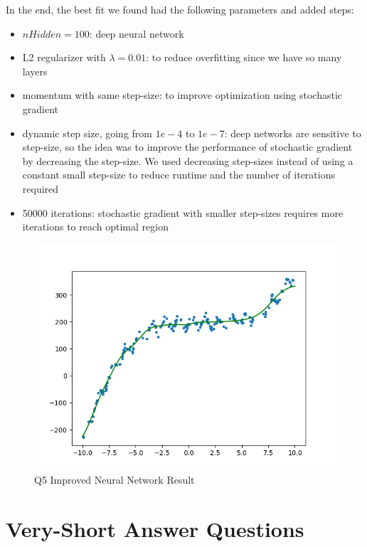 \documentclass{article}
\def\items#1{\begin{itemize}#1\end{itemize}}
\begin{document}
In the end, the best fit we found had the following parameters and added steps:
\items{
    \item $nHidden = 100$: deep neural network
    \item L2 regularizer with $\lambda = 0.01$: to reduce overfitting since we have so many layers
    \item momentum with same step-size: to improve optimization using stochastic gradient
    \item dynamic step size, going from $1e-4$ to $1e-7$: deep networks are sensitive to step-size, so the idea was to improve the performance of stochastic gradient by decreasing the step-size. We used decreasing step-sizes instead of using a constant small step-size to reduce runtime and the number of iterations required
    \item 50000 iterations: stochastic gradient with smaller step-sizes requires more iterations to reach optimal region
}

\begin{figure}[h!]
    \includegraphics[width=48em]{a5_q3.png}
    \caption{Q5 Improved Neural Network Result}
    \label{fig:q3}
\end{figure}

\section{Very-Short Answer Questions}
\end{document}
